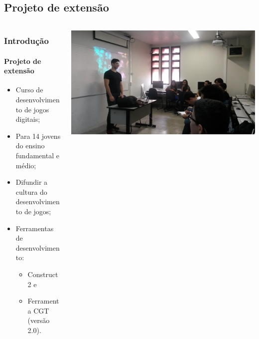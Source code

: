 \documentclass{beamer}
\begin{document}
   \subsection{Projeto de extensão}
   \begin{frame}
      \begin{columns}[T]
         \begin{column}{0.48\textwidth}
            \frametitle{Introdução}
            \framesubtitle{Projeto de extensão}
            \begin{itemize}
               \item Curso de desenvolvimento de jogos digitais;
               \item Para 14 jovens do ensino fundamental e médio;
               \item Difundir a cultura do desenvolvimento de jogos;
               \item Ferramentas de desenvolvimento:
                  \begin{itemize}
                     \item Construct 2 e
                     \item Ferramenta CGT (versão 2.0).
                  \end{itemize}
            \end{itemize}
         \end{column}
         \begin{column}{0.48\textwidth}
            \includegraphics[width=\textwidth]{images/ext/20150921_101616.jpg}
         \end{column}
      \end{columns}
   \end{frame}
\end{document}
